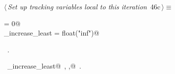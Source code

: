 \documentclass[11.5pt]{report}
\begin{document}
\begin{flushleft} \small\label{scrap71}\raggedright\small
{} $\langle\,${\itshape Set up tracking variables local to this iteration}\nobreak\ {\footnotesize {46c}}$\,\rangle\equiv$
\vspace{-1ex}
\begin{list}{}{} \item
\mbox{}\verb@ibest                = 0@\\
\mbox{}\verb@delta_increase_least = float("inf")@\\
\mbox{}\verb@@{\NWsep}
\end{list}
\vspace{-1.5ex}
\footnotesize
\begin{list}{}{\setlength{\itemsep}{-\parsep}\setlength{\itemindent}{-\leftmargin}}
\item \NWtxtMacroRefIn\ .
\item \NWtxtIdentsDefed\nobreak\  \verb@delta_increase_least@\nobreak\ , \verb@ibest,@\nobreak\ .
\item{}
\end{list}
\vspace{4ex}
\end{flushleft}

\vspace{-0.8cm}\newchunk 
\end{document}
